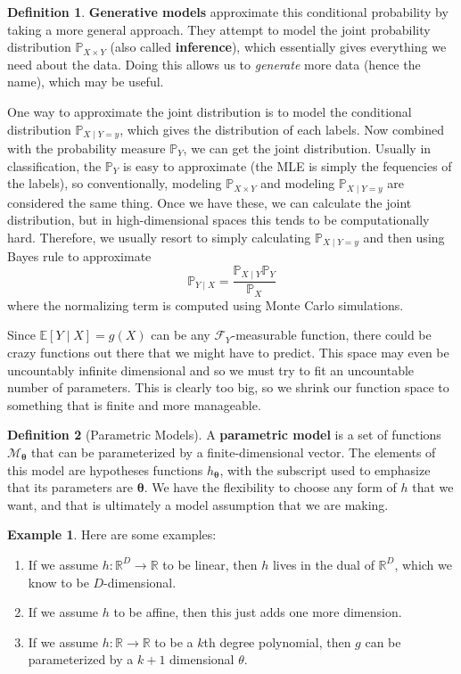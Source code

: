 \documentclass{article}
\theoremstyle{definition}
\newtheorem{example}{Example}[section]
\theoremstyle{remark}
\theoremstyle{definition}
\newtheorem{definition}{Definition}[section]
\begin{document}
\begin{definition}
\textbf{Generative models} approximate this conditional probability by taking a more general approach. They attempt to model the joint probability distribution $\mathbb{P}_{X \times Y}$ (also called \textbf{inference}), which essentially gives everything we need about the data. Doing this allows us to \textit{generate} more data (hence the name), which may be useful. 
    
One way to approximate the joint distribution is to model the conditional distribution $\mathbb{P}_{X \mid Y = y}$, which gives the distribution of each labels. Now combined with the probability measure $\mathbb{P}_Y$, we can get the joint distribution. Usually in classification, the $\mathbb{P}_Y$ is easy to approximate (the MLE is simply the fequencies of the labels), so conventionally, modeling $\mathbb{P}_{X \times Y}$ and modeling $\mathbb{P}_{X \mid Y = y}$ are considered the same thing. Once we have these, we can calculate the joint distribution, but in high-dimensional spaces this tends to be computationally hard. Therefore, we usually resort to simply calculating $\mathbb{P}_{X \mid Y = y}$ and then using Bayes rule to approximate 
\[\mathbb{P}_{Y \mid X} = \frac{\mathbb{P}_{X \mid Y} \mathbb{P}_Y}{\mathbb{P}_X}\]
where the normalizing term is computed using Monte Carlo simulations. 
\end{definition}

Since $\mathbb{E}[Y \mid X] = g(X)$ can be any $\mathcal{F}_Y$-measurable function, there could be crazy functions out there that we might have to predict. This space may even be uncountably infinite dimensional and so we must try to fit an uncountable number of parameters. This is clearly too big, so we shrink our function space to something that is finite and more manageable. 

\begin{definition}[Parametric Models]
A \textbf{parametric model} is a set of functions $\mathcal{M}_{\boldsymbol{\theta}}$ that can be parameterized by a finite-dimensional vector. The elements of this model are hypotheses functions $h_{\boldsymbol{\theta}}$, with the subscript used to emphasize that its parameters are $\boldsymbol{\theta}$. We have the flexibility to choose any form of $h$ that we want, and that is ultimately a model assumption that we are making. 
\end{definition}

\begin{example}
Here are some examples: 
\begin{enumerate}
    \item If we assume $h: \mathbb{R}^D \rightarrow \mathbb{R}$ to be linear, then $h$ lives in the dual of $\mathbb{R}^D$, which we know to be $D$-dimensional. 
    \item If we assume $h$ to be affine, then this just adds one more dimension. 
    \item If we assume $h: \mathbb{R} \rightarrow \mathbb{R}$ to be a $k$th degree polynomial, then $g$ can be parameterized by a $k+1$ dimensional $\theta$. 
\end{enumerate}
\end{example}
\end{document}
